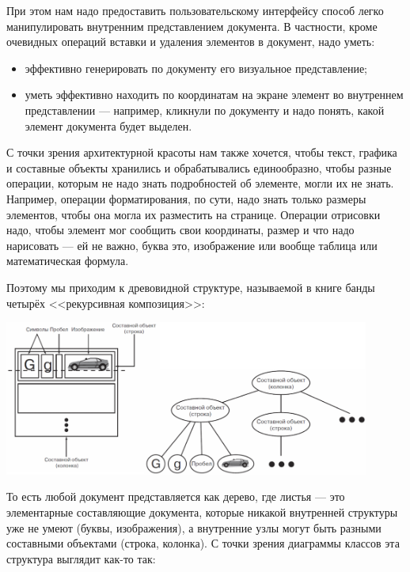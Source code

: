 \documentclass{../text-style}
\begin{document}
При этом нам надо предоставить пользовательскому интерфейсу способ легко манипулировать внутренним представлением документа. В частности, кроме очевидных операций вставки и удаления элементов в документ, надо уметь:

\begin{itemize}
    \item эффективно генерировать по документу его визуальное представление;
    \item уметь эффективно находить по координатам на экране элемент во внутреннем представлении --- например, кликнули по документу и надо понять, какой элемент документа будет выделен.
\end{itemize}

С точки зрения архитектурной красоты нам также хочется, чтобы текст, графика и составные объекты хранились и обрабатывались единообразно, чтобы разные операции, которым не надо знать подробностей об элементе, могли их не знать. Например, операции форматирования, по сути, надо знать только размеры элементов, чтобы она могла их разместить на странице. Операции отрисовки надо, чтобы элемент мог сообщить свои координаты, размер и что надо нарисовать --- ей не важно, буква это, изображение или вообще таблица или математическая формула.

Поэтому мы приходим к древовидной структуре, называемой в книге банды четырёх <<рекурсивная композиция>>:

\begin{center}
    \includegraphics[width=0.9\textwidth]{recursiveComposition.png}
\end{center}

То есть любой документ представляется как дерево, где листья --- это элементарные составляющие документа, которые никакой внутренней структуры уже не умеют (буквы, изображения), а внутренние узлы могут быть разными составными объектами (строка, колонка). С точки зрения диаграммы классов эта структура выглядит как-то так:
\end{document}
